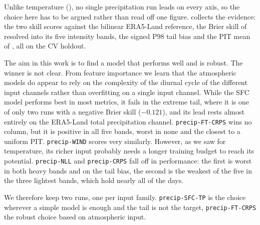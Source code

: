 Unlike temperature (), no single precipitation run leads on every
axis, so the choice here has to be argued rather than read off one figure.
 collects the evidence: the two skill scores against the bilinear
ERA5-Land reference, the Brier skill of  resolved
into its five intensity bands, the signed P98 tail bias and the PIT mean of
, all on the CV holdout.

The aim in this work is to find a model that performs well and is robust. The winner is not clear. From feature importance  we learn that the atmospheric models do appear to rely on the complexity of the diurnal cycle of the different input channels rather than overfitting on a single input channel. While the SFC model performs best in most
metrics, it fails in the extreme tail, where it is one of only two runs with a negative Brier skill
($-0.121$), and its lead rests almost entirely on the ERA5-Land total precipitation channel.
\texttt{precip-FT-CRPS} wins no column, but it is positive in all five bands, worst in none and the
closest to a uniform PIT. \texttt{precip-WIND} scores very similarly. However, as we saw for
temperature, its richer input probably needs a longer training budget to reach its potential.
\texttt{precip-NLL} and \texttt{precip-CRPS} fall off in performance: the first is worst in both heavy bands
and on the tail bias, the second is the weakest of the five in the three lightest bands, which hold nearly all of the
days.

We therefore keep two runs, one per input family. \texttt{precip-SFC-TP} is the choice wherever a
simple model is enough and the tail is not the target, \texttt{precip-FT-CRPS} the robust choice based on
atmospheric input.


